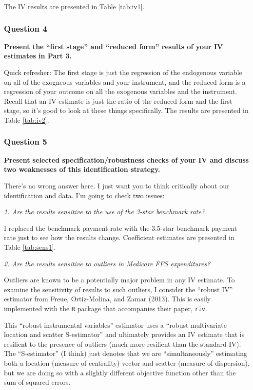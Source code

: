 \documentclass[
  12pt,
]{article}
\begin{document}
The IV results are presented in Table \ref{tab:iv1}.

\hypertarget{question-4}{%
\subsubsection{Question 4}\label{question-4}}

\textbf{Present the ``first stage'' and ``reduced form'' results of your IV estimates in Part 3.}

Quick refresher: The first stage is just the regression of the endogenous variable on all of the exogneous variables and your instrument, and the reduced form is a regression of your outcome on all the exogenous variables and the instrument. Recall that an IV estimate is just the ratio of the reduced form and the first stage, so it's good to look at these things specifically. The results are presented in Table \ref{tab:iv2}.

\hypertarget{question-5}{%
\subsubsection{Question 5}\label{question-5}}

\textbf{Present selected specification/robustness checks of your IV and discuss two weaknesses of this identification strategy.}

There's no wrong answer here. I just want you to think critically about our identification and data. I'm going to check two issues:

\emph{1. Are the results sensitive to the use of the 3-star benchmark rate?}

I replaced the benchmark payment rate with the 3.5-star benchmark payment rate just to see how the results change. Coefficient estimates are presented in Table \ref{tab:sens1}.

\emph{2. Are the results sensitive to outliers in Medicare FFS expenditures?}

Outliers are known to be a potentially major problem in any IV estimate. To examine the sensitivity of results to such outliers, I consider the ``robust IV'' estimator from Freue, Ortiz-Molina, and Zamar (2013). This is easily implemented with the \texttt{R} package that accompanies their paper, \texttt{riv}.

This ``robust instrumental variables'' estimator uses a ``robust multivariate location and scatter S-estimator'' and ultimately provides an IV estimate that is resilient to the presence of outliers (much more resilient than the standard IV). The ``S-estimator'' (I think) just denotes that we are ``simultaneously'' estimating both a location (measure of centrality) vector and scatter (measure of dispersion), but we are doing so with a slightly different objective function other than the sum of squared errors.
\end{document}
